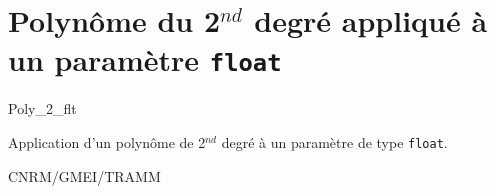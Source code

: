 %
\section{Polyn\^ome du 2$^{nd}$ degr\'e appliqu\'e \`a un param\`etre \texttt{float}}

 \textsf{Poly\_2\_flt}
\label{OP-Poly_2_flt}

Application d'un polyn\^ome de 2$^{nd}$ degr\'e
\`a un param\`etre de type \texttt{float}.

\bigskip





CNRM/GMEI/TRAMM

